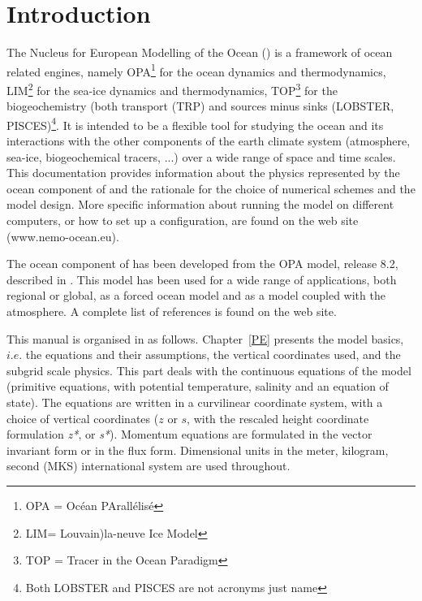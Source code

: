 

\chapter{Introduction}

The Nucleus for European Modelling of the Ocean (\NEMO) is a framework of ocean 
related engines, namely OPA\footnote{OPA = Oc\'{e}an PArall\'{e}lis\'{e}} for the 
ocean dynamics and thermodynamics, LIM\footnote{LIM= Louvain)la-neuve Ice 
Model} for the sea-ice dynamics and thermodynamics, TOP\footnote{TOP = Tracer 
in the Ocean Paradigm} for the biogeochemistry (both transport (TRP) and sources 
minus sinks (LOBSTER, PISCES)\footnote{Both LOBSTER and PISCES are not 
acronyms just name}. It is intended to be a flexible tool for studying the ocean and 
its interactions with the other components of the earth climate system (atmosphere, 
sea-ice, biogeochemical tracers, ...) over a wide range of space and time scales. 
This documentation provides information about the physics represented by the ocean 
component of \NEMO and the rationale for the choice of numerical schemes and 
the model design. More specific information about running the model on different 
computers, or how to set up a configuration, are found on the \NEMO web site 
(www.nemo-ocean.eu). 

The ocean component of \NEMO has been developed from the OPA model, 
release 8.2, described in \citet{Madec1998}. This model has been used for a wide 
range of applications, both regional or global, as a forced ocean model and as a 
model coupled with the atmosphere. A complete list of references is found on the 
\NEMO web site. 

This manual is organised in as follows. Chapter~\ref{PE} presents the model basics, 
$i.e.$ the equations and their assumptions, the vertical coordinates used, and the 
subgrid scale physics. This part deals with the continuous equations of the model 
(primitive equations, with potential temperature, salinity and an equation of state). 
The equations are written in a curvilinear coordinate system, with a choice of vertical 
coordinates ($z$ or $s$, with the rescaled height coordinate formulation \textit{z*}, or  
\textit{s*}). Momentum equations are formulated in the vector invariant form or in the 
flux form. Dimensional units in the meter, kilogram, second (MKS) international system 
are used throughout.

